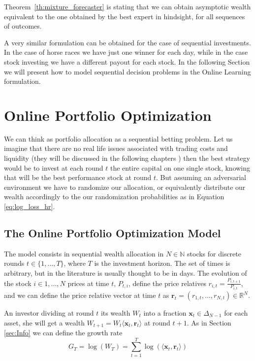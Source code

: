 Theorem~\ref{th:mixture_forecaster} is stating that we can obtain asymptotic wealth equivalent to the one obtained by the best expert in hindsight, for all sequences of outcomes. 

A very similar formulation can be obtained for the case of sequential investments. In the case of horse races we have just one winner for each day, while in the case stock investing we have a different payout for each stock. In the following Section we will present how to model sequential decision problems in the Online Learning formulation.

\section{Online Portfolio Optimization}

We can think as portfolio allocation as a sequential betting problem. Let us imagine that there are no real life issues associated with trading costs and liquidity (they will be discussed in the following chapters ) then the best strategy would be to invest at each round $t$ the entire capital on one single stock, knowing that will be the best performance stock at round $t$. But assuming an adversarial environment we have to randomize our allocation, or equivalently distribute our wealth accordingly to the our randomization probabilities as in Equation \eqref{eq:log_loss_hr}. 

\subsection{The Online Portfolio Optimization Model}

The model consists in sequential wealth allocation in $N\in\mathbb N$ stocks for discrete rounds $t\in\{1,\ldots,T\}$, where $T$ is the investment horizon. The set of times is arbitrary, but in the literature is usually thought to be in days. The evolution of the stock $i\in 1,\ldots,N$ prices at time $t$, $P_{t,i}$, define the price relatives $r_{i,t}=\frac{P_{i,t+1}}{P_{i,t}}$, and we can define the price relative vector at time $t$ as $\mathbf r_t=(r_{1,t},\ldots,r_{N,t})\in\mathbb R^N$. 

An investor dividing at round $t$ its wealth $W_t$ into a fraction $\mathbf x_t\in\Delta_{N-1}$ for each asset, she will get a wealth $W_{t+1}=W_t\langle \mathbf x_t,\mathbf r_t\rangle$ at round $t+1$. As in Section \ref{sec:Info} we can define the growth rate 
$$G_T=\log(W_T)=\sum\limits_{t=1}^T\log(\langle\mathbf x_t, \mathbf r_t\rangle)$$

